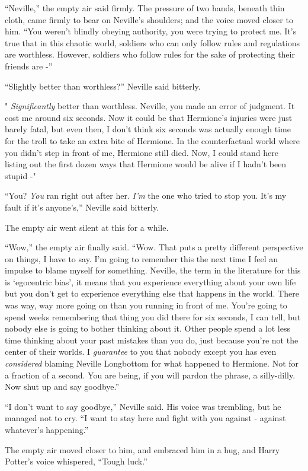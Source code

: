 ``Neville,'' the empty air said firmly. The pressure of two hands,
beneath thin cloth, came firmly to bear on Neville's shoulders; and the
voice moved closer to him. ``You weren't blindly obeying authority, you
were trying to protect me. It's true that in this chaotic world,
soldiers who can only follow rules and regulations are worthless.
However, soldiers who follow rules for the sake of protecting their
friends are -''

``Slightly better than worthless?'' Neville said bitterly.

" \emph{Significantly} better than worthless. Neville, you made an error
of judgment. It cost me around six seconds. Now it could be that
Hermione's injuries were just barely fatal, but even then, I don't think
six seconds was actually enough time for the troll to take an extra bite
of Hermione. In the counterfactual world where you didn't step in front
of me, Hermione still died. Now, I could stand here listing out the
first dozen ways that Hermione would be alive if I hadn't been stupid -"

``You? \emph{You} ran right out after her. \emph{I'm} the one who tried
to stop you. It's my fault if it's anyone's,'' Neville said bitterly.

The empty air went silent at this for a while.

``Wow,'' the empty air finally said. ``Wow. That puts a pretty different
perspective on things, I have to say. I'm going to remember this the
next time I feel an impulse to blame myself for something. Neville, the
term in the literature for this is `egocentric bias', it means that you
experience everything about your own life but you don't get to
experience everything else that happens in the world. There was way, way
more going on than you running in front of me. You're going to spend
weeks remembering that thing you did there for six seconds, I can tell,
but nobody else is going to bother thinking about it. Other people spend
a lot less time thinking about your past mistakes than you do, just
because you're not the center of their worlds. I \emph{guarantee} to you
that nobody except you has even \emph{considered} blaming Neville
Longbottom for what happened to Hermione. Not for a fraction of a
second. You are being, if you will pardon the phrase, a silly-dilly. Now
shut up and say goodbye.''

``I don't want to say goodbye,'' Neville said. His voice was trembling,
but he managed not to cry. ``I want to stay here and fight with you
against - against whatever's happening.''

The empty air moved closer to him, and embraced him in a hug, and Harry
Potter's voice whispered, ``Tough luck.''

